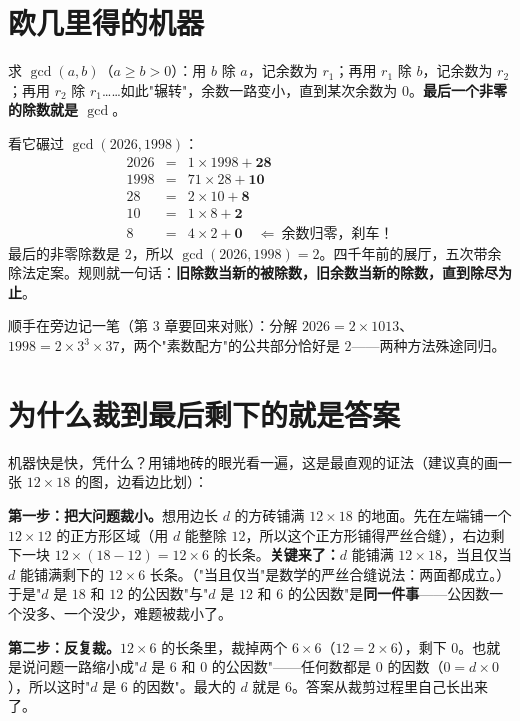 \section{欧几里得的机器}

\begin{dingli}
求 $\gcd(a, b)$（$a \ge b > 0$）：用 $b$ 除 $a$，记余数为 $r_1$；再用 $r_1$ 除 $b$，记余数为 $r_2$；再用 $r_2$ 除 $r_1$……如此"辗转"，余数一路变小，直到某次余数为 $0$。\textbf{最后一个非零的除数就是 $\gcd$}。
\end{dingli}

看它碾过 $\gcd(2026, 1998)$：
\[
\begin{array}{rcl}
2026 & = & 1 \times 1998 + \mathbf{28} \\
1998 & = & 71 \times 28 + \mathbf{10} \\
28 & = & 2 \times 10 + \mathbf{8} \\
10 & = & 1 \times 8 + \mathbf{2} \\
8 & = & 4 \times 2 + \mathbf{0} \quad\Longleftarrow\ \text{余数归零，刹车！}
\end{array}
\]
最后的非零除数是 $2$，所以 $\gcd(2026, 1998) = \boxed{2}$。四千年前的展厅，五次带余除法定案。规则就一句话：\textbf{旧除数当新的被除数，旧余数当新的除数，直到除尽为止}。

顺手在旁边记一笔（第 3 章要回来对账）：分解 $2026 = 2 \times 1013$、$1998 = 2 \times 3^3 \times 37$，两个"素数配方"的公共部分恰好是 $2$——两种方法殊途同归。

\section{为什么裁到最后剩下的就是答案}

机器快是快，凭什么？用铺地砖的眼光看一遍，这是最直观的证法（建议真的画一张 $12\times 18$ 的图，边看边比划）：

\textbf{第一步：把大问题裁小。}想用边长 $d$ 的方砖铺满 $12\times 18$ 的地面。先在左端铺一个 $12\times 12$ 的正方形区域（用 $d$ 能整除 $12$，所以这个正方形铺得严丝合缝），右边剩下一块 $12 \times (18-12) = 12\times 6$ 的长条。\textbf{关键来了：}$d$ 能铺满 $12\times18$，当且仅当 $d$ 能铺满剩下的 $12\times 6$ 长条。（"当且仅当"是数学的严丝合缝说法：两面都成立。）于是"$d$ 是 $18$ 和 $12$ 的公因数"与"$d$ 是 $12$ 和 $6$ 的公因数"是\textbf{同一件事}——公因数一个没多、一个没少，难题被裁小了。

\textbf{第二步：反复裁。}$12 \times 6$ 的长条里，裁掉两个 $6\times 6$（$12 = 2\times 6$），剩下 $0$。也就是说问题一路缩小成"$d$ 是 $6$ 和 $0$ 的公因数"——任何数都是 $0$ 的因数（$0 = d\times 0$），所以这时"$d$ 是 $6$ 的因数"。最大的 $d$ 就是 $6$。答案从裁剪过程里自己长出来了。

